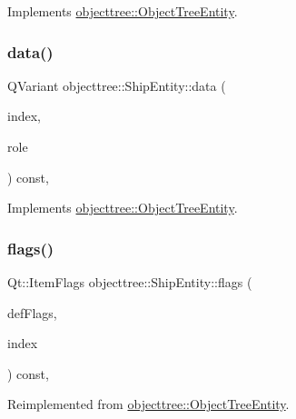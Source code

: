 Implements \mbox{\hyperlink{classobjecttree_1_1_object_tree_entity_a70fd25eccf88b305e9db15fbe3daeae8}{objecttree\+::\+Object\+Tree\+Entity}}.

\mbox{\label{classobjecttree_1_1_ship_entity_ad1fd003ed90d82f0c621292941484e5b}} 
\subsubsection{\texorpdfstring{data()}{data()}}
{\footnotesize\ttfamily Q\+Variant objecttree\+::\+Ship\+Entity\+::data (\begin{DoxyParamCaption}\item[{const Q\+Model\+Index \&}]{index,  }\item[{int}]{role }\end{DoxyParamCaption}) const\hspace{0.3cm}{\ttfamily [override]}, {\ttfamily [virtual]}}



Implements \mbox{\hyperlink{classobjecttree_1_1_object_tree_entity_a2413c6573de18b451d97eb3800f10f35}{objecttree\+::\+Object\+Tree\+Entity}}.

\mbox{\label{classobjecttree_1_1_ship_entity_abc1800df4441a71edbb129f2c8326ecb}} 
\subsubsection{\texorpdfstring{flags()}{flags()}}
{\footnotesize\ttfamily Qt\+::\+Item\+Flags objecttree\+::\+Ship\+Entity\+::flags (\begin{DoxyParamCaption}\item[{Qt\+::\+Item\+Flags}]{def\+Flags,  }\item[{const Q\+Model\+Index \&}]{index }\end{DoxyParamCaption}) const\hspace{0.3cm}{\ttfamily [override]}, {\ttfamily [virtual]}}



Reimplemented from \mbox{\hyperlink{classobjecttree_1_1_object_tree_entity_a71042bfb5a8328bcbde9d283c0b1b28c}{objecttree\+::\+Object\+Tree\+Entity}}.

